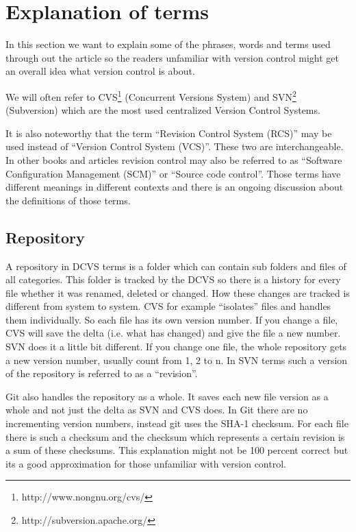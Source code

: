 \section{Explanation of terms}

In this section we want to explain some of the phrases, words and terms used through out the article so the 
readers unfamiliar with version control might get an overall idea what version control is about.

We will often refer to CVS\footnote{http://www.nongnu.org/cvs/} (Concurrent Versions System) and SVN\footnote{http://subversion.apache.org/} (Subversion) which are the most used centralized Version Control Systems.

It is also noteworthy that the term “Revision Control System (RCS)” may be used instead of “Version Control System (VCS)”. These two are interchangeable. In other books and articles revision control may also be referred to as “Software Configuration Management (SCM)” or “Source code control”. Those terms have different meanings in different contexts and there is an ongoing discussion about the definitions of those terms.

\subsection{Repository}

A repository in DCVS terms is a folder which can contain sub folders and files of all categories. 
This folder is tracked by the DCVS so there is a history for every file whether it was renamed, deleted or changed. 
How these changes are tracked is different from system to system. CVS for example “isolates” 
files and handles them individually. So each file has its own version number. If you change a file, CVS will 
save the delta (i.e. what has changed) and give the file a new number. SVN does it a little bit 
different. If you change one file, the whole repository gets a new version number, usually count from 1, 2 to n. 
In SVN terms such a version of the repository is referred to as a “revision”.

Git also handles the repository as a whole. It saves each new file version as a whole and not just the delta as SVN and CVS does. 
In Git there are no incrementing version numbers, instead git uses the SHA-1 checksum. For each file there is such a 
checksum and the checksum which represents a certain revision is a sum of these checksums. 
This explanation might not be 100 percent correct but its a good approximation for those unfamiliar with version control.


